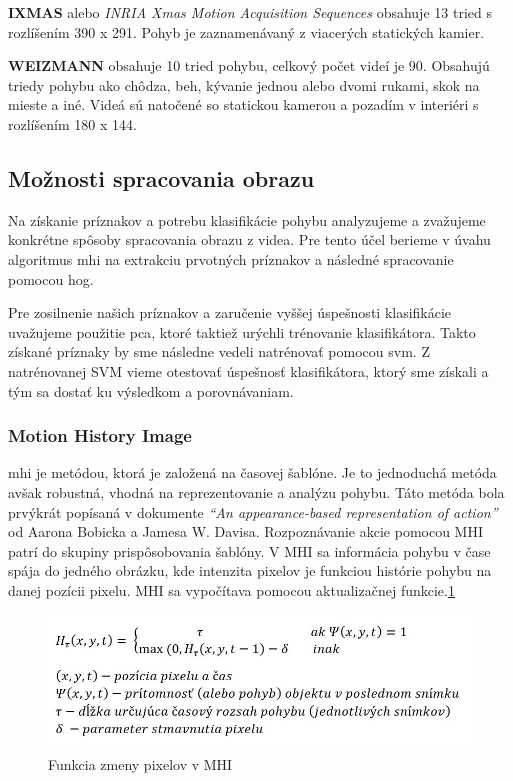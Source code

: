 \textbf{IXMAS} alebo \textit{INRIA Xmas Motion Acquisition Sequences} obsahuje 13 tried s rozlíšením 390 x 291. Pohyb je zaznamenávaný z viacerých statických kamier. \cite{c1}

\textbf{WEIZMANN} obsahuje 10 tried pohybu, celkový počet videí je 90. Obsahujú triedy pohybu ako chôdza, beh, kývanie jednou alebo dvomi rukami, skok na mieste a iné. Videá sú natočené so statickou kamerou a pozadím  v interiéri  s rozlíšením 180 x 144. \cite{c1}

\subsection{Možnosti spracovania obrazu}
Na získanie príznakov a potrebu klasifikácie pohybu analyzujeme a zvažujeme konkrétne spôsoby spracovania obrazu z videa. Pre tento účel berieme v úvahu algoritmus \acrfull{mhi} na extrakciu prvotných príznakov a následné spracovanie pomocou \acrfull{hog}. 

Pre zosilnenie našich príznakov a zaručenie vyššej úspešnosti klasifikácie uvažujeme použitie \acrfull{pca}, ktoré taktiež urýchli trénovanie klasifikátora. Takto získané príznaky by sme následne vedeli natrénovať pomocou \acrfull{svm}. Z natrénovanej SVM vieme otestovať úspešnosť klasifikátora, ktorý sme získali a tým sa dostať ku výsledkom a porovnávaniam. 

\subsubsection{Motion History Image} \label{MHIlabel}
\acrshort{mhi} je metódou, ktorá je založená na časovej šablóne. Je to jednoduchá metóda avšak robustná, vhodná na reprezentovanie a analýzu pohybu.\cite{c3}  Táto metóda bola prvýkrát popísaná v dokumente \textit{``An appearance-based representation of action''} od Aarona Bobicka a Jamesa W. Davisa.\cite{c2} Rozpoznávanie akcie pomocou MHI patrí do skupiny prispôsobovania šablóny. V MHI sa informácia pohybu v čase spája do jedného obrázku, kde intenzita pixelov je funkciou histórie pohybu na danej pozícii pixelu. MHI sa vypočítava pomocou aktualizačnej funkcie.\ref{MHIeq}


\begin{figure}[H]
  \centering
  \includegraphics[width=14cm]{img/MHIeq.jpg}
  \caption{Funkcia zmeny pixelov v MHI}
  \label{MHIeq}
\end{figure}

